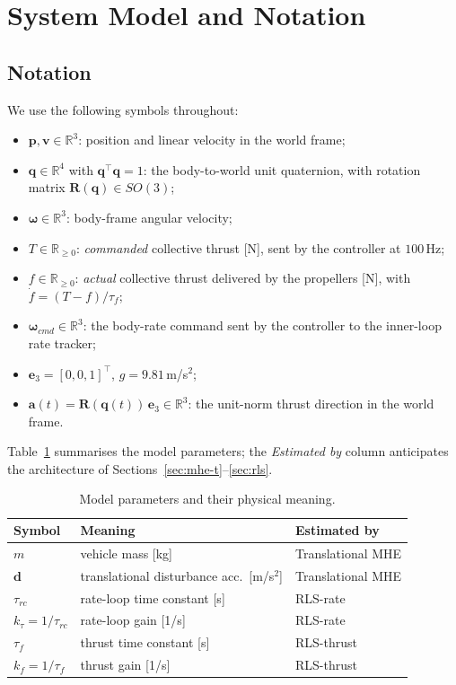 \documentclass[lettersize,journal]{IEEEtran}
\newcommand{\R}{\mathbb{R}}
\newcommand{\SOg}{SO(3)}
\newcommand{\vect}[1]{\bm{#1}}
\begin{document}
\section{System Model and Notation}\label{sec:model}

\subsection{Notation}
We use the following symbols throughout:
\begin{itemize}
\item $\vect p,\vect v\in\R^3$: position and linear velocity in
the world frame;
\item $\vect q\in\R^4$ with $\vect q^\top\vect q=1$: the
body-to-world unit quaternion, with rotation matrix
$\vect R(\vect q)\in\SOg$;
\item $\vect\omega\in\R^3$: body-frame angular velocity;
\item $T\in\R_{\ge0}$: \emph{commanded} collective thrust [N],
sent by the controller at $100$\,Hz;
\item $f\in\R_{\ge0}$: \emph{actual} collective thrust delivered
by the propellers [N], with $\dot f = (T-f)/\tau_f$;
\item $\vect\omega_{cmd}\in\R^3$: the body-rate command sent by
the controller to the inner-loop rate tracker;
\item $\vect e_3 = [0,0,1]^\top$, $g=9.81$\,m/s$^2$;
\item $\vect a(t)=\vect R(\vect q(t))\,\vect e_3\in\R^3$: the
unit-norm thrust direction in the world frame.
\end{itemize}
Table~\ref{tab:notation} summarises the model parameters; the
\emph{Estimated by} column anticipates the architecture of
Sections~\ref{sec:mhe-t}--\ref{sec:rls}.

\begin{table}[t]
\centering
\caption{Model parameters and their physical meaning.}
\label{tab:notation}
\begin{tabular}{lll}
\toprule
Symbol & Meaning & Estimated by \\
\midrule
$m$                  & vehicle mass [kg]                        & Translational MHE \\
$\vect d$            & translational disturbance acc.\ [m/s$^2$]& Translational MHE \\
$\tau_{rc}$          & rate-loop time constant [s]              & RLS-rate \\
$k_\tau=1/\tau_{rc}$ & rate-loop gain [1/s]                     & RLS-rate \\
$\tau_f$             & thrust time constant [s]                 & RLS-thrust \\
$k_f=1/\tau_f$       & thrust gain [1/s]                        & RLS-thrust \\
\bottomrule
\end{tabular}
\end{table}
\end{document}
